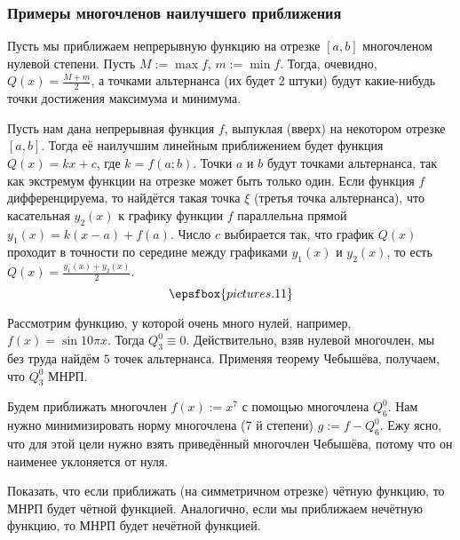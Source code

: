 \documentclass[a4paper]{article}
\begin{document}
\subsubsection{Примеры многочленов наилучшего приближения}

\begin{ex}
Пусть мы приближаем непрерывную функцию на отрезке $[a,b]$ многочленом
нулевой степени. Пусть $M:= \max f$, $m := \min f$.  Тогда, очевидно,
$Q(x) = \frac{M+m}{2}$, а точками альтернанса (их будет 2 штуки) будут
какие-нибудь точки достижения максимума и минимума.
\end{ex}

\begin{ex}
Пусть нам дана непрерывная функция $f$, выпуклая (вверх) на некотором
отрезке $[a,b]$. Тогда её наилучшим линейным приближением будет
функция $Q(x)= kx+c$, где $k = f(a;b)$. Точки $a$ и $b$ будут точками
альтернанса, так как экстремум функции на отрезке может быть только
один. Если функция $f$ дифференцируема, то найдётся такая точка $\xi$
(третья точка альтернанса), что касательная $y_2(x)$ к графику функции
$f$ параллельна прямой $y_1(x) = k(x-a)+f(a)$.  Число $c$ выбирается
так, что график $Q(x)$ проходит в точности по середине между графиками
$y_1(x)$ и $y_2(x)$, то есть $Q(x) = \frac{y_1(x)+y_2(x)}{2}$.
$$\epsfbox{pictures.11}$$
\end{ex}

\begin{ex}
Рассмотрим функцию, у которой очень много нулей, например, $f(x) =
\sin 10\pi x$.  Тогда $Q_3^0 \equiv 0$. Действительно, взяв нулевой
многочлен, мы без труда найдём $5$ точек альтернанса. Применяя теорему
Чебышёва, получаем, что $Q_3^0$ МНРП.
\end{ex}

\begin{ex}
Будем приближать многочлен $f(x) := x^7$ с помощью многочлена
$Q_6^0$. Нам нужно минимизировать норму многочлена (7 й степени) $g :=
f- Q_6^0$. Ежу ясно, что для этой цели нужно взять приведённый
многочлен Чебышёва, потому что он наименее уклоняется от нуля.
\end{ex}

\begin{problem}
Показать, что если приближать (на симметричном отрезке) чётную
функцию, то МНРП будет чётной функцией. Аналогично, если мы приближаем
нечётную функцию, то МНРП будет нечётной функцией.
\end{problem}
\end{document}
